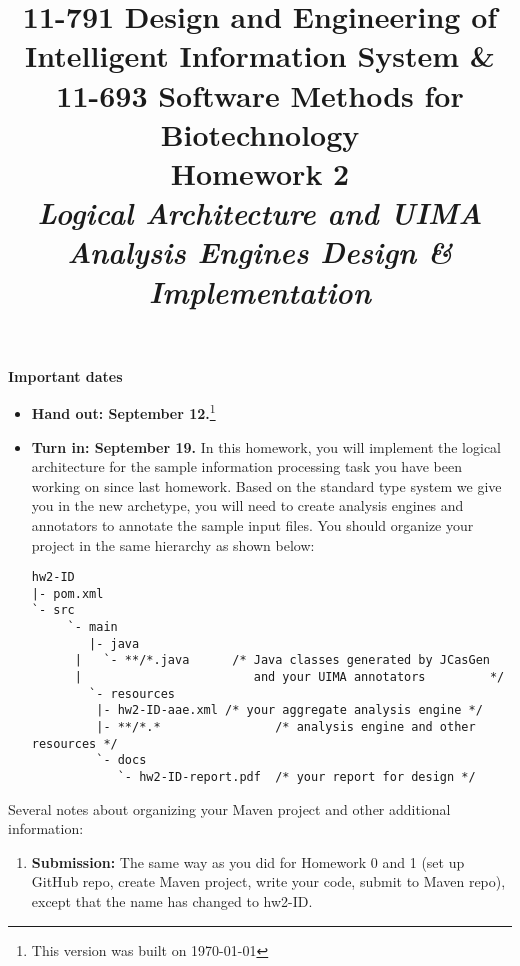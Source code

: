 \documentclass[oneside]{memoir}
\title{{\bfseries 11-791 Design and Engineering of Intelligent Information
System \& \\11-693 Software Methods for Biotechnology \\Homework 2}\\
\vspace{1em}
\itshape\rmfamily Logical Architecture and UIMA Analysis Engines Design \&
Implementation}
\date{}
\begin{document}
\begin{titlingpage}
\maketitle

\hspace{-0.1\textwidth}
\begin{minipage}{1.2\textwidth}
\vspace{-5em}
\textbf{Important dates}
\begin{itemize}

\item \textbf{Hand out: September 12.}\footnote{This version was built on \today}

\item \textbf{Turn in: September 19.} In this homework, you will implement the
logical architecture for the sample information processing task you have been
working on since last homework. Based on the standard type system we give you in
the new archetype, you will need to create analysis engines and annotators to
annotate the sample input files. You should organize your project in the same
hierarchy as shown below:

\small
\begin{verbatim}
hw2-ID
|- pom.xml
`- src
     `- main
        |- java
      |   `- **/*.java      /* Java classes generated by JCasGen
      |                        and your UIMA annotators         */ 
        `- resources
         |- hw2-ID-aae.xml /* your aggregate analysis engine */
         |- **/*.*                /* analysis engine and other resources */
         `- docs
            `- hw2-ID-report.pdf  /* your report for design */

\end{verbatim}
\normalsize

\end{itemize}

\end{minipage}
\hspace{-0.1\textwidth}

\hspace{-0.1\textwidth}
\begin{minipage}{1.2\textwidth}

Several notes about organizing your Maven project and other additional
information:

\begin{enumerate}

\item \textbf{Submission:} The same way as you did for Homework 0 and 1 (set up
GitHub repo, create Maven project, write your code, submit to Maven repo),
except that the name has changed to hw2-ID.


\end{enumerate}
\end{minipage}
\end{titlingpage}
\end{document}
